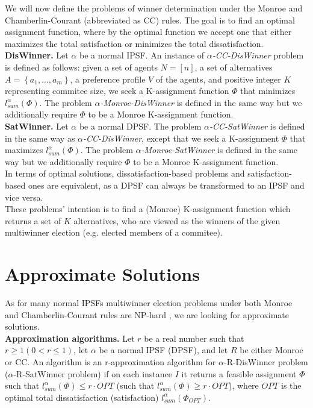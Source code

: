 We will now define the problems of winner determination under the Monroe and Chamberlin-Courant (abbreviated as CC) rules. The goal is to find an optimal assignment function, where by the optimal function we accept one that either maximizes the total satisfaction or minimizes the total dissatisfaction.
\\

\noindent
\textbf{DisWinner.} Let $\alpha$ be a normal IPSF. An instance of $\alpha$\textit{-CC-DisWinner} problem is defined as follows: given a set of agents $N = [n]$, a set of alternatives $A = \left\{ a_{1}, \ldots, a_{m} \right\}$, a preference profile $V$ of the agents, and positive integer $K$ representing commitee size, we seek a K-assignment function $\Phi$ that minimizes $l^{\alpha}_{sum}(\Phi)$. The problem $\alpha$\textit{-Monroe-DisWinner} is defined in the same way but we additionally require $\Phi$ to be a Monroe K-assignment function.
\\

\noindent
\textbf{SatWinner.} Let $\alpha$ be a normal DPSF. The problem $\alpha$\textit{-CC-SatWinner} is defined in the same way as $\alpha$\textit{-CC-DisWinner}, except that we seek a K-assignment $\Phi$ that maximizes $l^{\alpha}_{sum}(\Phi)$. The problem $\alpha$\textit{-Monroe-SatWinner} is defined in the same way but we additionally require $\Phi$ to be a Monroe K-assignment function.
\\

In terms of optimal solutions, dissatisfaction-based problems and satisfaction-based ones are equivalent, as a DPSF can always be transformed to an IPSF and vice versa.
\\

These problems' intention is to find a (Monroe) K-assignment function which returns a set of $K$ alternatives, who are viewed as the winners of the given multiwinner election (e.g. elected members of a commitee).

\section{Approximate Solutions}

As for many normal IPSFs multiwinner election problems under both Monroe and Chamberlin-Courant rules are NP-hard \cite{2,3}, we are looking for approximate solutions.
\\

\noindent
\textbf{Approximation algorithms.} Let $r$ be a real number such that $r \geq 1 (0 < r \leq 1)$, let $\alpha$ be a normal IPSF (DPSF), and let $R$ be either Monroe or CC. An algorithm is an r-approximation algorithm for $\alpha$-R-DisWinner problem ($\alpha$-R-SatWinner problem) if on each instance $I$ it returns a feasible assignment $\Phi$ such that $l^{\alpha}_{sum}(\Phi) \leq r \cdot OPT$ (such that $l^{\alpha}_{sum}(\Phi) \geq r \cdot OPT$), where $OPT$ is the optimal total dissatisfaction (satisfaction) $l^{\alpha}_{sum}(\Phi_{OPT})$.
\\
